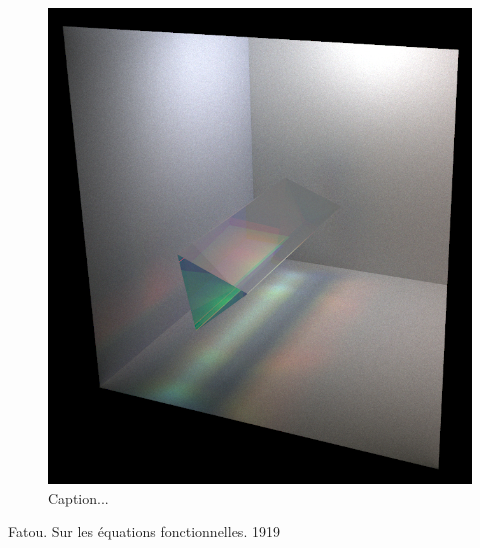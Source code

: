 \documentclass[12pt]{article}
\begin{document}
\begin{figure} 
\centering
  \includegraphics[width = 6 in]{v_rt_reflect_prism.png}
  \caption{ Caption...
}
\end{figure}

\pagebreak

\begin{thebibliography}{9}

 Fatou. Sur les \'equations fonctionnelles. 1919


\end{thebibliography}
\end{document}
